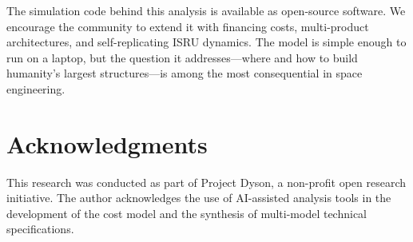 \documentclass[preprint,12pt]{elsarticle}
\begin{document}
The simulation code behind this analysis is available as open-source software. We encourage the community to extend it with financing costs, multi-product architectures, and self-replicating ISRU dynamics. The model is simple enough to run on a laptop, but the question it addresses---where and how to build humanity's largest structures---is among the most consequential in space engineering.


\section*{Acknowledgments}

This research was conducted as part of Project Dyson, a non-profit open research initiative. The author acknowledges the use of AI-assisted analysis tools in the development of the cost model and the synthesis of multi-model technical specifications.
\end{document}
